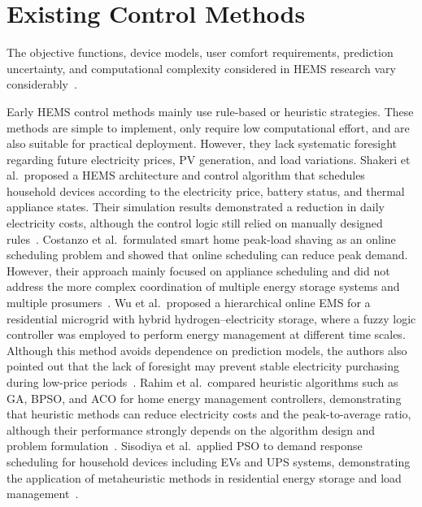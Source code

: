 \section{Existing Control Methods}
The objective functions, device models, user comfort requirements, prediction uncertainty, and computational complexity considered in HEMS research vary considerably~\parencite{BEAUDIN2015318}. 

Early HEMS control methods mainly use rule-based or heuristic strategies. These methods are simple to implement, only require low computational effort, and are also suitable for practical deployment. However, they lack systematic foresight regarding future electricity prices, PV generation, and load variations. Shakeri et al.\ proposed a HEMS architecture and control algorithm that schedules household devices according to the electricity price, battery status, and thermal appliance states. Their simulation results demonstrated a reduction in daily electricity costs, although the control logic still relied on manually designed rules~\parencite{SHAKERI2017154}. Costanzo et al.\ formulated smart home peak-load shaving as an online scheduling problem and showed that online scheduling can reduce peak demand. However, their approach mainly focused on appliance scheduling and did not address the more complex coordination of multiple energy storage systems and multiple prosumers~\parencite{5984354}. Wu et al.\ proposed a hierarchical online EMS for a residential microgrid with hybrid hydrogen--electricity storage, where a fuzzy logic controller was employed to perform energy management at different time scales. Although this method avoids dependence on prediction models, the authors also pointed out that the lack of foresight may prevent stable electricity purchasing during low-price periods~\parencite{WU2024123020}. Rahim et al.\ compared heuristic algorithms such as GA, BPSO, and ACO for home energy management controllers, demonstrating that heuristic methods can reduce electricity costs and the peak-to-average ratio, although their performance strongly depends on the algorithm design and problem formulation~\parencite{RAHIM2016452}. Sisodiya et al.\ applied PSO to demand response scheduling for household devices including EVs and UPS systems, demonstrating the application of metaheuristic methods in residential energy storage and load management~\parencite{8385345}.

